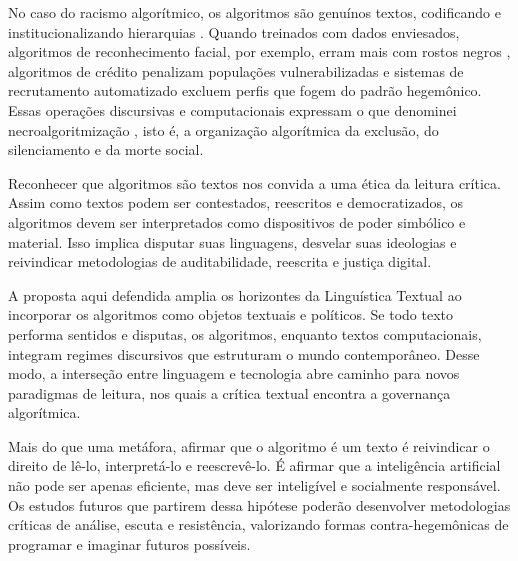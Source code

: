 \documentclass[portuguese]{textolivre}
\begin{document}
No caso do racismo algorítmico, os algoritmos são genuínos textos, codificando e institucionalizando hierarquias \cite{araujo2024_microagressoes,araujo2024_racismo_ia}. Quando treinados com dados enviesados, algoritmos de reconhecimento facial, por exemplo, erram mais com rostos negros \cite{buolamwini2018}, algoritmos de crédito penalizam populações vulnerabilizadas \cite{loya2022} e sistemas de recrutamento automatizado excluem perfis que fogem do padrão hegemônico. Essas operações discursivas e computacionais expressam o que denominei necroalgoritmização \cite{araujo2025_necroalgoritmizacao}, isto é, a organização algorítmica da exclusão, do silenciamento e da morte social.

Reconhecer que algoritmos são textos nos convida a uma ética da leitura crítica. Assim como textos podem ser contestados, reescritos e democratizados, os algoritmos devem ser interpretados como dispositivos de poder simbólico e material. Isso implica disputar suas linguagens, desvelar suas ideologias e reivindicar metodologias de auditabilidade, reescrita e justiça digital.

A proposta aqui defendida amplia os horizontes da Linguística Textual ao incorporar os algoritmos como objetos textuais e políticos. Se todo texto performa sentidos e disputas, os algoritmos, enquanto textos computacionais, integram regimes discursivos que estruturam o mundo contemporâneo. Desse modo, a interseção entre linguagem e tecnologia abre caminho para novos paradigmas de leitura, nos quais a crítica textual encontra a governança algorítmica.

Mais do que uma metáfora, afirmar que o algoritmo é um texto é reivindicar o direito de lê-lo, interpretá-lo e reescrevê-lo. É afirmar que a inteligência artificial não pode ser apenas eficiente, mas deve ser inteligível e socialmente responsável. Os estudos futuros que partirem dessa hipótese poderão desenvolver metodologias críticas de análise, escuta e resistência, valorizando formas contra-hegemônicas de programar e imaginar futuros possíveis.


\printbibliography\label{sec-bib}
\end{document}
